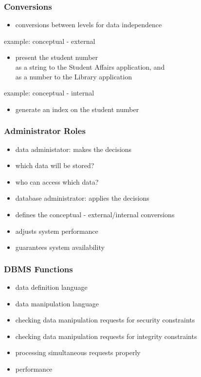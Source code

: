 \documentclass[dvipsnames]{beamer}
\theoremstyle{plain}
\begin{document}
\begin{frame}
  \frametitle{Conversions}

  \begin{itemize}
    \item conversions between levels for data independence
  \end{itemize}

  \medskip
  \begin{exampleblock}{example: conceptual - external}
    \begin{itemize}
      \item present the student number\\
        as a string to the Student Affairs application, and\\
        as a number to the Library application
    \end{itemize}
  \end{exampleblock}

  \pause
  \begin{exampleblock}{example: conceptual - internal}
    \begin{itemize}
      \item generate an index on the student number
    \end{itemize}
  \end{exampleblock}
\end{frame}

\begin{frame}
  \frametitle{Administrator Roles}

  \begin{itemize}
    \item data administator: makes the decisions
    \item which data will be stored?
    \item who can access which data?

    \pause
    \bigskip
    \item database administrator: applies the decisions
    \item defines the conceptual - external/internal conversions
    \item adjusts system performance
    \item guarantees system availability
  \end{itemize}
\end{frame}

\begin{frame}
  \frametitle{DBMS Functions}

  \begin{itemize}
    \item data definition language
    \item data manipulation language

    \pause
    \medskip
    \item checking data manipulation requests for security constraints
    \item checking data manipulation requests for integrity constraints
    \item processing simultaneous requests properly
    \item performance
  \end{itemize}
\end{frame}
\end{document}

